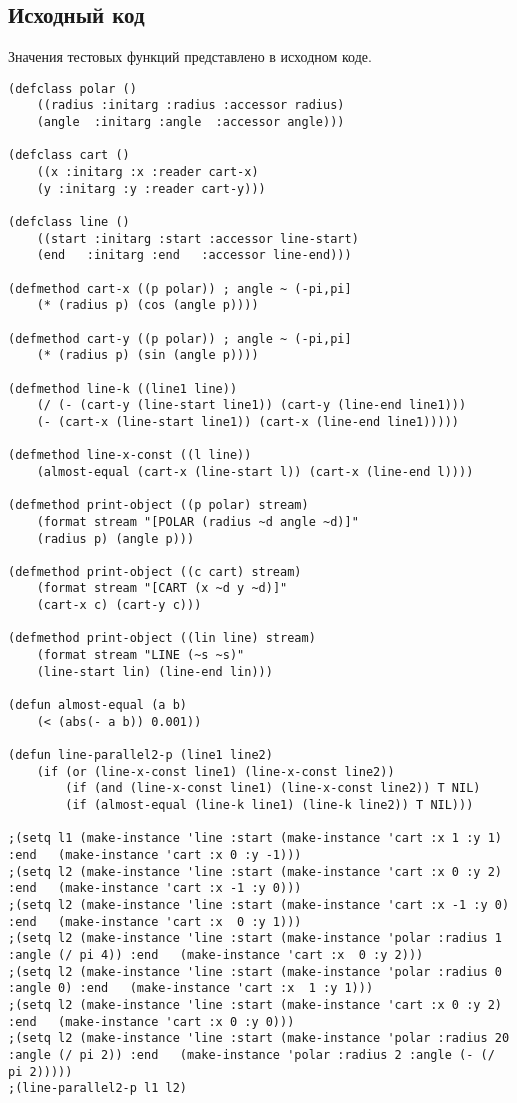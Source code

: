 \documentclass[12pt]{article}
\begin{document}
\subsection{Исходный код}
Значения тестовых функций представлено в исходном коде.
\begin{verbatim}
(defclass polar ()
    ((radius :initarg :radius :accessor radius)
    (angle  :initarg :angle  :accessor angle)))

(defclass cart ()
    ((x :initarg :x :reader cart-x)
    (y :initarg :y :reader cart-y)))

(defclass line ()
    ((start :initarg :start :accessor line-start)
    (end   :initarg :end   :accessor line-end)))

(defmethod cart-x ((p polar)) ; angle ~ (-pi,pi]
    (* (radius p) (cos (angle p))))

(defmethod cart-y ((p polar)) ; angle ~ (-pi,pi]
    (* (radius p) (sin (angle p))))

(defmethod line-k ((line1 line))
    (/ (- (cart-y (line-start line1)) (cart-y (line-end line1)))
    (- (cart-x (line-start line1)) (cart-x (line-end line1)))))

(defmethod line-x-const ((l line))
    (almost-equal (cart-x (line-start l)) (cart-x (line-end l))))

(defmethod print-object ((p polar) stream)
    (format stream "[POLAR (radius ~d angle ~d)]"
    (radius p) (angle p)))

(defmethod print-object ((c cart) stream)
    (format stream "[CART (x ~d y ~d)]"
    (cart-x c) (cart-y c)))

(defmethod print-object ((lin line) stream)
    (format stream "LINE (~s ~s)"
    (line-start lin) (line-end lin)))

(defun almost-equal (a b)
    (< (abs(- a b)) 0.001))

(defun line-parallel2-p (line1 line2)
    (if (or (line-x-const line1) (line-x-const line2))
        (if (and (line-x-const line1) (line-x-const line2)) T NIL)
        (if (almost-equal (line-k line1) (line-k line2)) T NIL)))

;(setq l1 (make-instance 'line :start (make-instance 'cart :x 1 :y 1)
:end   (make-instance 'cart :x 0 :y -1)))
;(setq l2 (make-instance 'line :start (make-instance 'cart :x 0 :y 2)
:end   (make-instance 'cart :x -1 :y 0)))
;(setq l2 (make-instance 'line :start (make-instance 'cart :x -1 :y 0)
:end   (make-instance 'cart :x  0 :y 1)))
;(setq l2 (make-instance 'line :start (make-instance 'polar :radius 1 
:angle (/ pi 4)) :end   (make-instance 'cart :x  0 :y 2)))
;(setq l2 (make-instance 'line :start (make-instance 'polar :radius 0 
:angle 0) :end   (make-instance 'cart :x  1 :y 1)))
;(setq l2 (make-instance 'line :start (make-instance 'cart :x 0 :y 2) 
:end   (make-instance 'cart :x 0 :y 0)))
;(setq l2 (make-instance 'line :start (make-instance 'polar :radius 20 
:angle (/ pi 2)) :end   (make-instance 'polar :radius 2 :angle (- (/ pi 2)))))
;(line-parallel2-p l1 l2)
\end{verbatim}
%
\end{document}
